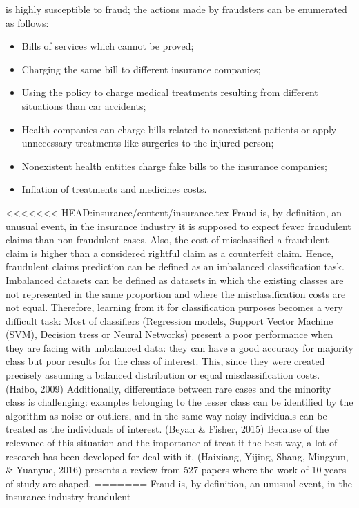 \documentclass[parskip=full]{scrartcl}
\begin{document}
is highly susceptible to fraud; the actions made by fraudsters can be 
enumerated as follows: 
\begin{itemize}
	\item Bills of services which cannot be proved;
	\item Charging the same bill to different insurance companies;
	\item Using the policy to charge medical treatments resulting from 
	different situations than car accidents;
	\item Health companies can charge bills related to nonexistent patients or 
	apply unnecessary treatments like surgeries to the injured person;
	\item Nonexistent health entities charge fake bills to the insurance 
	companies;
	\item Inflation of treatments and medicines costs.
\end{itemize}
<<<<<<< HEAD:insurance/content/insurance.tex
Fraud is, by definition, an unusual event, in the insurance industry it is 
supposed to expect fewer fraudulent claims than non-fraudulent cases. Also, the 
cost of misclassified a fraudulent claim is higher than a considered rightful 
claim as a counterfeit claim.  Hence, fraudulent claims prediction can be 
defined as an imbalanced classification task. 
Imbalanced datasets can be defined as datasets in which the existing classes 
are not represented in the same proportion and where the misclassification 
costs are not equal. Therefore, learning from it for classification purposes 
becomes a very difficult task: 
Most of classifiers (Regression models, Support Vector Machine (SVM), Decision 
tress or Neural Networks) present a poor performance when they are facing with 
unbalanced data: they can have a good accuracy for majority class but poor 
results for the class of interest.  This, since they were created precisely 
assuming a balanced distribution or equal misclassification costs. (Haibo, 
2009) 
Additionally, differentiate between rare cases and the minority class is 
challenging: examples belonging to the lesser class can be identified by the 
algorithm as noise or outliers, and in the same way noisy individuals can be 
treated as the individuals of interest. (Beyan & Fisher, 2015)
Because of the relevance of this situation and the importance of treat it the 
best way, a lot of research has been developed for deal with it, (Haixiang, 
Yijing, Shang, Mingyun, & Yuanyue, 2016) presents a review from 527 papers 
where the work of 10 years of study are shaped. 
=======
Fraud is, by definition, an unusual event, in the insurance industry fraudulent 
\end{document}
